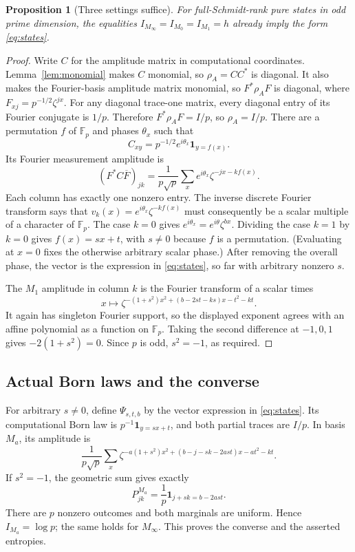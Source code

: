\documentclass[11pt]{article}
\newtheorem{proposition}[theorem]{Proposition}
\theoremstyle{remark}\newtheorem{remark}[theorem]{Remark}
\newcommand{\F}{\mathbb F}
\begin{document}
\begin{proposition}[Three settings suffice]\label{prop:three}
For full-Schmidt-rank pure states in odd prime dimension, the equalities $I_{M_\infty}=I_{M_0}=I_{M_1}=h$ already imply the form \eqref{eq:states}.
\end{proposition}
\begin{proof}
Write $C$ for the amplitude matrix in computational coordinates. Lemma~\ref{lem:monomial} makes $C$ monomial, so $\rho_A=CC^*$ is diagonal. It also makes the Fourier-basis amplitude matrix monomial, so $F^*\rho_A F$ is diagonal, where $F_{xj}=p^{-1/2}\zeta^{jx}$. For any diagonal trace-one matrix, every diagonal entry of its Fourier conjugate is $1/p$. Therefore $F^*\rho_A F=I/p$, so $\rho_A=I/p$. There are a permutation $f$ of $\F_p$ and phases $\theta_x$ such that
\[
 C_{xy}=p^{-1/2}e^{i\theta_x}\mathbf1_{y=f(x)}.
\]
Its Fourier measurement amplitude is
\[
 (F^*C\overline F)_{jk}=\frac1{p\sqrt p}
 \sum_xe^{i\theta_x}\zeta^{-jx-kf(x)}.
\]
Each column has exactly one nonzero entry. The inverse discrete Fourier transform says that $v_k(x)=e^{i\theta_x}\zeta^{-kf(x)}$ must consequently be a scalar multiple of a character of $\F_p$. The case $k=0$ gives $e^{i\theta_x}=e^{i\theta}\zeta^{bx}$. Dividing the case $k=1$ by $k=0$ gives $f(x)=sx+t$, with $s\ne0$ because $f$ is a permutation. (Evaluating at $x=0$ fixes the otherwise arbitrary scalar phase.) After removing the overall phase, the vector is the expression in \eqref{eq:states}, so far with arbitrary nonzero $s$.

The $M_1$ amplitude in column $k$ is the Fourier transform of a scalar times
\[
 x\longmapsto\zeta^{-(1+s^2)x^2+(b-2st-ks)x-t^2-kt}.
\]
It again has singleton Fourier support, so the displayed exponent agrees with an affine polynomial as a function on $\F_p$. Taking the second difference at $-1,0,1$ gives $-2(1+s^2)=0$. Since $p$ is odd, $s^2=-1$, as required.
\end{proof}

\subsection{Actual Born laws and the converse}
For arbitrary $s\ne0$, define $\Psi_{s,t,b}$ by the vector expression in \eqref{eq:states}. Its computational Born law is $p^{-1}\mathbf1_{y=sx+t}$, and both partial traces are $I/p$. In basis $M_a$, its amplitude is
\begin{equation}\label{eq:amplitude}
 \frac1{p\sqrt p}\sum_x
 \zeta^{-a(1+s^2)x^2+(b-j-sk-2ast)x-at^2-kt}.
\end{equation}
If $s^2=-1$, the geometric sum gives exactly
\begin{equation}\label{eq:born-line}
 P^{M_a}_{jk}=\frac1p\mathbf1_{j+sk=b-2ast}.
\end{equation}
There are $p$ nonzero outcomes and both marginals are uniform. Hence $I_{M_a}=\log p$; the same holds for $M_\infty$. This proves the converse and the asserted entropies.
\end{document}
